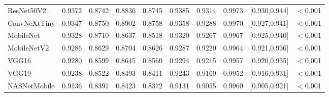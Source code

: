 {\begin{longtable}{L{1.9cm}ccccccccc}
ResNet50V2&0.9372&0.8742&0.8836&0.8745&0.9385&0.9314&0.9973&[0.930,0.944]&$<$0.001\\
ConvNeXtTiny&0.9347&0.8750&0.8902&0.8758&0.9358&0.9288&0.9970&[0.927,0.941]&$<$0.001\\
MobileNet&0.9328&0.8710&0.8637&0.8518&0.9320&0.9267&0.9967&[0.925,0.940]&$<$0.001\\
MobileNetV2&0.9286&0.8629&0.8704&0.8626&0.9287&0.9220&0.9964&[0.921,0.936]&$<$0.001\\
VGG16&0.9280&0.8599&0.8645&0.8560&0.9294&0.9215&0.9957&[0.920,0.935]&$<$0.001\\
VGG19&0.9238&0.8522&0.8493&0.8411&0.9243&0.9169&0.9952&[0.916,0.931]&$<$0.001\\
NASNetMobile&0.9136&0.8391&0.8423&0.8372&0.9131&0.9055&0.9960&[0.905,0.921]&$<$0.001\\
\end{longtable}
}
